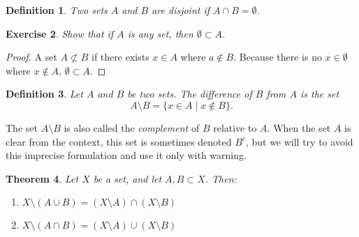 \documentclass{amsart}
\newtheorem{theorem}{Theorem}
\newtheorem{definition}[theorem]{Definition}
\newtheorem{exercise}[theorem]{Exercise}
\newcommand{\1}{\mathds{1}}
\numberwithin{equation}{section}
\numberwithin{theorem}{section}
\begin{document}
\begin{definition}  
Two sets $A$ and $B$ are \emph{disjoint} if $A\cap B=\emptyset$.
\end{definition}  

\begin{exercise}  
Show that if $A$ is any set, then $\emptyset\subset A$.

\end{exercise}

\begin{proof}
	A set $A\not\subset B$ if there exists $x\in A$ where $a\notin B$. Because there is no $x\in \emptyset$ where $x\notin A$, $\emptyset\subset A$.
\end{proof}

\begin{definition}  
Let $A$ and $B$ be two sets. 
The \emph{difference} of $B$ from $A$ is the set
\[
A \setminus B = \{ x \in A \mid x \notin B \}.
\]
\end{definition}

The set $A \setminus B$ is also called the \emph{complement} of $B$ relative to $A$.
When the set $A$ is clear from the context, this set is sometimes denoted $B^{c}$, but we will 
try to avoid this imprecise formulation and use it only with warning.



\begin{theorem} 
Let $X$ be a set, and let $A, B\subset X$.  Then:
\begin{enumerate}
\item[a)]
$X\setminus (A\cup B)=(X\setminus A)\cap (X\setminus B)$

\item[b)]
$X\setminus (A\cap B)=(X\setminus A)\cup (X\setminus B)$

\end{enumerate}
\end{theorem}
\end{document}
